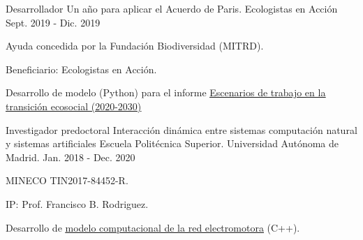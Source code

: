 \begin{cventries}
  \cventry %
    {Desarrollador} %
    {Un año para aplicar el Acuerdo de Paris.} %
    {Ecologistas en Acción} %
    {Sept. 2019 - Dic. 2019} %
    {
      \begin{cvitems} %
      	\item {Ayuda concedida por la Fundación Biodiversidad (MITRD).}
        \item {Beneficiario: Ecologistas en Acción.}
        \item {Desarrollo de modelo (Python) para el informe \underline{\href{https://www.ecologistasenaccion.org/132893/informe-escenarios-de-trabajo-en-la-transicion-ecosocial-2020-2030/}{Escenarios de trabajo en la transición ecosocial (2020-2030)}} }
      \end{cvitems}
    }

  \cventry
    {Investigador predoctoral} %
    {Interacción dinámica entre sistemas computación natural y sistemas artificiales} %
    {Escuela Politécnica Superior. Universidad Autónoma de Madrid.} %
    {Jan. 2018 - Dec. 2020} %
    {
      \begin{cvitems} %
        \item {MINECO TIN2017-84452-R.}
        \item {IP: Prof. Francisco B. Rodriguez.}
        \item {Desarrollo de \underline{\href{https://github.com/GNB-UAM/electromotor-nmodel}{modelo computacional de la red electromotora}} (C++).}
      \end{cvitems}
    }
    



\end{cventries}

